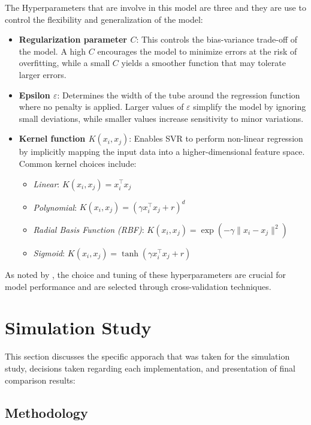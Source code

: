 \documentclass[8pt,twocolumn]{article}
\begin{document}
The Hyperparameters that are involve in this model are three and they are use to control
the flexibility and generalization of the model:

\begin{itemize}
    \item \textbf{Regularization parameter $C$}: This controls the bias-variance trade-off of the model. A high $C$ encourages the model to minimize errors at the risk of overfitting, while a small $C$ yields a smoother function that may tolerate larger errors.
    \item \textbf{Epsilon $\varepsilon$}: Determines the width of the tube around the regression function where no penalty is applied. Larger values of $\varepsilon$ simplify the model by ignoring small deviations, while smaller values increase sensitivity to minor variations.
    \item \textbf{Kernel function $K(x_i, x_j)$}: Enables SVR to perform non-linear regression by implicitly mapping the input data into a higher-dimensional feature space. Common kernel choices include:
    \begin{itemize}
        \item \textit{Linear}: $K(x_i, x_j) = x_i^\top x_j$
        \item \textit{Polynomial}: $K(x_i, x_j) = (\gamma x_i^\top x_j + r)^d$
        \item \textit{Radial Basis Function (RBF)}: $K(x_i, x_j) = \exp(-\gamma \|x_i - x_j\|^2)$
        \item \textit{Sigmoid}: $K(x_i, x_j) = \tanh(\gamma x_i^\top x_j + r)$
    \end{itemize}
\end{itemize}

As noted by \cite{hastie2009elements}, the choice and tuning of these hyperparameters are crucial for model performance and are selected through cross-validation techniques.


\section{Simulation Study}

This section discusses the specific apporach that was taken for the simulation
study, decisions taken regarding each implementation, and presentation of final
comparison results:

\subsection{Methodology}
\end{document}
